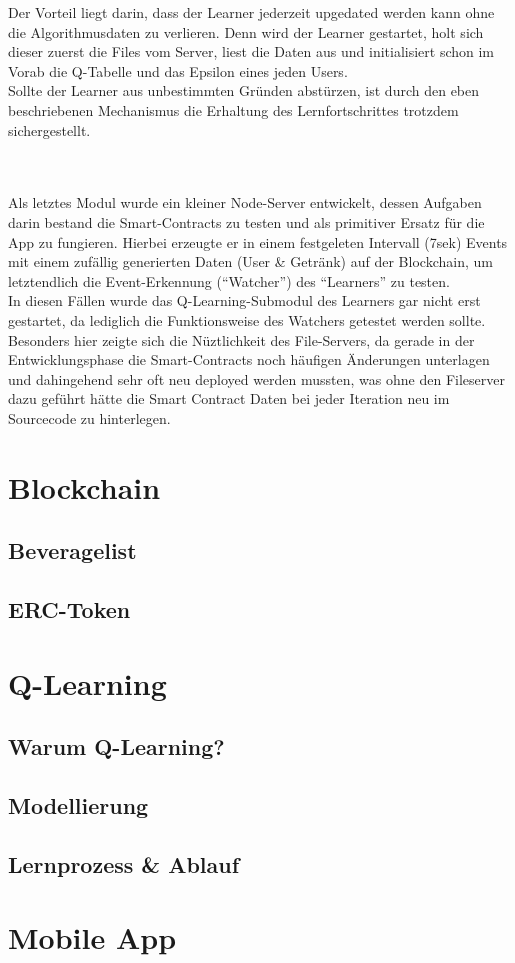 Der Vorteil liegt darin, dass der Learner jederzeit upgedated werden kann ohne die Algorithmusdaten zu verlieren. Denn wird der Learner gestartet, holt sich dieser zuerst die Files vom Server, liest die Daten aus und initialisiert schon im Vorab die Q-Tabelle und das Epsilon eines jeden Users. \\
Sollte der Learner aus unbestimmten Gründen abstürzen, ist durch den eben beschriebenen Mechanismus die Erhaltung des Lernfortschrittes trotzdem sichergestellt.

\\\\Als letztes Modul wurde ein kleiner Node-Server entwickelt, dessen Aufgaben darin bestand die Smart-Contracts zu testen und als primitiver Ersatz für die App zu fungieren. Hierbei erzeugte er in einem festgeleten Intervall (7sek) Events mit einem zufällig generierten Daten (User \& Getränk) auf der Blockchain, um letztendlich die Event-Erkennung (“Watcher”) des “Learners” zu testen.
\\In diesen Fällen wurde das Q-Learning-Submodul des Learners gar nicht erst gestartet, da lediglich die Funktionsweise des Watchers getestet werden sollte. \\
Besonders hier zeigte sich die Nüztlichkeit des File-Servers, da gerade in der Entwicklungsphase die Smart-Contracts noch häufigen Änderungen unterlagen und dahingehend sehr oft neu deployed werden mussten, was ohne den Fileserver dazu geführt hätte die Smart Contract Daten bei jeder Iteration neu im Sourcecode zu hinterlegen.  

\section{Blockchain}
\subsection{Beveragelist}
\subsection{ERC-Token}

\section{Q-Learning}
\subsection{Warum Q-Learning?}
\subsection{Modellierung}
\subsection{Lernprozess \& Ablauf}

\section{Mobile App}


